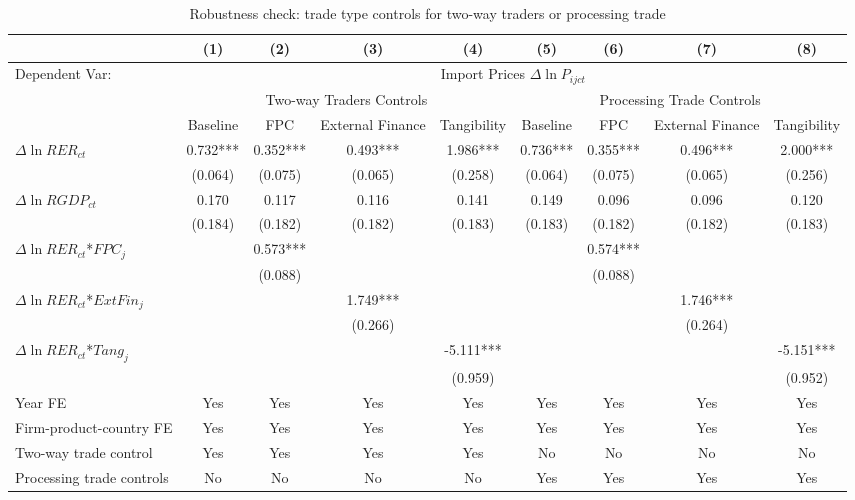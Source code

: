 \begin{table}
	\centering
	\caption{Robustness check: trade type controls for two-way traders or processing trade}
	\begin{threeparttable}
		\begin{tabular}{lcccccccc}
			\toprule
			& (1)   & (2)   & (3)   & (4) &  (5)  &  (6)   & (7)   & (8)\\
			\midrule
                Dependent Var: & \multicolumn{8}{c}{ Import Prices $\Delta \ln P_{ijct}$} \\
			& \multicolumn{4}{c}{Two-way Traders Controls} & \multicolumn{4}{c}{Processing Trade Controls}\\
			& Baseline & FPC & External Finance & Tangibility & Baseline & FPC & External Finance & Tangibility\\
			\midrule
			$\Delta \ln RER_{ct}$ & 0.732*** & 0.352*** & 0.493*** & 1.986*** & 0.736*** & 0.355*** & 0.496*** & 2.000*** \\
			& (0.064) & (0.075) & (0.065) & (0.258) & (0.064) & (0.075) & (0.065) & (0.256) \\
			$\Delta \ln RGDP_{ct}$ & 0.170 & 0.117 & 0.116 & 0.141 & 0.149 & 0.096 & 0.096 & 0.120 \\
			& (0.184) & (0.182) & (0.182) & (0.183) & (0.183) & (0.182) & (0.182) & (0.183) \\
			$\Delta \ln RER_{ct}$*$FPC_{j}$ &   & 0.573*** &       &       &       & 0.574*** &       &  \\
			&   & (0.088) &       &       &       & (0.088) &       &  \\
			$\Delta \ln RER_{ct}$*$ExtFin_{j}$ &    &       & 1.749*** &       &       &       & 1.746*** &  \\
			&     &       & (0.266) &       &       &       & (0.264) &  \\
			$\Delta \ln RER_{ct}$*$Tang_{j}$ &     &       &       & -5.111*** &       &       &       & -5.151*** \\
			&     &       &       & (0.959) &       &       &       & (0.952) \\
                \midrule
			Year FE  &  Yes   & Yes   & Yes   & Yes &  Yes   & Yes   & Yes   & Yes\\
			Firm-product-country FE &  Yes   & Yes   & Yes   & Yes &  Yes   & Yes   & Yes   & Yes\\
			Two-way trade control &  Yes   & Yes   & Yes   & Yes & No & No & No & No\\
			Processing trade controls & No & No & No & No &  Yes   & Yes   & Yes  & Yes \\

\end{tabular}
\end{threeparttable}
\end{table}
